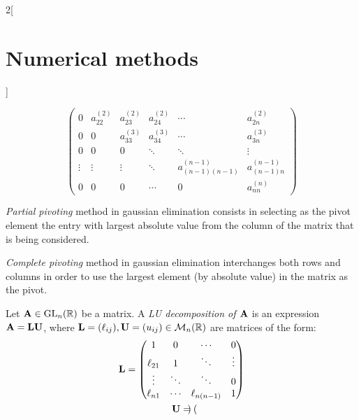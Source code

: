 \documentclass[../../../main.tex]{subfiles}
\begin{document}
\begin{multicols}{2}[\section{Numerical methods}]
\begin{method}
$$\begin{pmatrix}
                0            & a_{22}^{(2)} & a_{23}^{(2)} & a_{24}^{(2)} & \cdots                 & a_{2n}^{(2)}       \\
                0            & 0            & a_{33}^{(3)} & a_{34}^{(3)} & \cdots                 & a_{3n}^{(3)}       \\
                0            & 0            & 0            & \ddots       & \ddots                 & \vdots             \\
                \vdots       & \vdots       & \vdots       & \ddots       & a_{(n-1)(n-1)}^{(n-1)} & a_{(n-1)n}^{(n-1)} \\
                0            & 0            & 0            & \cdots       & 0                      & a_{nn}^{(n)}
            \end{pmatrix}
        $$
    \end{method}
    \begin{method}
        \textit{Partial pivoting} method in gaussian elimination consists in selecting as the pivot element the entry with largest absolute value from the column of the matrix that is being considered.
    \end{method}
    \begin{method}
        \textit{Complete pivoting} method in gaussian elimination interchanges both rows and columns in order to use the largest element (by absolute value) in the matrix as the pivot.
    \end{method}
    \begin{definition}[LU descompostion]
        Let $\boldsymbol{\mathrm{A}}\in\mathrm{GL}_n(\mathbb{R})$ be a matrix. A \textit{LU decomposition of $\boldsymbol{\mathrm{A}}$} is an expression $\boldsymbol{\mathrm{A}}=\boldsymbol{\mathrm{L}}\boldsymbol{\mathrm{U}}$, where $\boldsymbol{\mathrm{L}}=(\ell_{ij}),\boldsymbol{\mathrm{U}}=(u_{ij})\in\mathcal{M}_n(\mathbb{R})$ are matrices of the form:
        \begin{gather}\label{NM_L}
            \boldsymbol{\mathrm{L}}=
            \begin{pmatrix}
                1         & 0      & \cdots        & 0      \\
                \ell_{21} & 1      & \ddots        & \vdots \\
                \vdots    & \ddots & \ddots        & 0      \\
                \ell_{n1} & \cdots & \ell_{n(n-1)} & 1
            \end{pmatrix}\\\label{NM_U}
            \boldsymbol{\mathrm{U}}=
            \begin{pmatrix}

\end{pmatrix}
\end{gather}
\end{definition}
\end{multicols}
\end{document}
